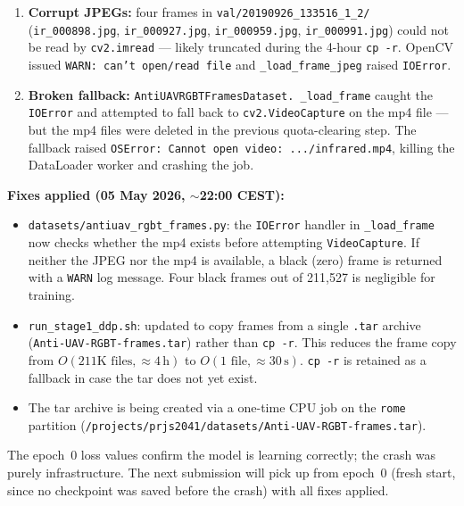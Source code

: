 \begin{enumerate}
    \item \textbf{Corrupt JPEGs:} four frames in
          \texttt{val/20190926\_133516\_1\_2/} (\texttt{ir\_000898.jpg},
          \texttt{ir\_000927.jpg}, \texttt{ir\_000959.jpg},
          \texttt{ir\_000991.jpg}) could not be read by
          \texttt{cv2.imread} — likely truncated during the 4-hour
          \texttt{cp -r}. OpenCV issued \texttt{WARN: can't open/read
          file} and \texttt{\_load\_frame\_jpeg} raised \texttt{IOError}.
    \item \textbf{Broken fallback:} \texttt{AntiUAVRGBTFramesDataset.\-
          \_load\_frame} caught the \texttt{IOError} and attempted to
          fall back to \texttt{cv2.VideoCapture} on the mp4 file — but
          the mp4 files were deleted in the previous quota-clearing step.
          The fallback raised \texttt{OSError: Cannot open video:
          .../infrared.mp4}, killing the DataLoader worker and crashing
          the job.
\end{enumerate}

\textbf{Fixes applied (05 May 2026, $\sim$22:00 CEST):}
\begin{itemize}
    \item \texttt{datasets/antiuav\_rgbt\_frames.py}: the \texttt{IOError}
          handler in \texttt{\_load\_frame} now checks whether the mp4
          exists before attempting \texttt{VideoCapture}. If neither
          the JPEG nor the mp4 is available, a black (zero) frame is
          returned with a \texttt{WARN} log message. Four black frames
          out of 211,527 is negligible for training.
    \item \texttt{run\_stage1\_ddp.sh}: updated to copy frames from a
          single \texttt{.tar} archive (\texttt{Anti-UAV-RGBT-frames.tar})
          rather than \texttt{cp -r}. This reduces the frame copy from
          $O(211\text{K files}, \approx 4\,\text{h})$ to
          $O(1\text{ file}, \approx 30\,\text{s})$.
          \texttt{cp -r} is retained as a fallback in case the tar
          does not yet exist.
    \item The tar archive is being created via a one-time CPU job
          on the \texttt{rome} partition
          (\texttt{/projects/prjs2041/datasets/Anti-UAV-RGBT-frames.tar}).
\end{itemize}

\noindent The epoch~0 loss values confirm the model is learning correctly;
the crash was purely infrastructure. The next submission will pick up
from epoch~0 (fresh start, since no checkpoint was saved before the
crash) with all fixes applied.

